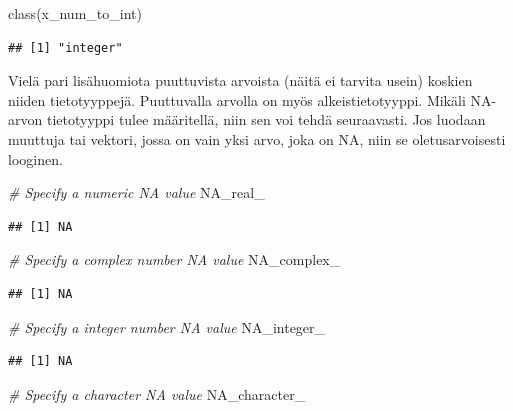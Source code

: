 \documentclass[
]{book}
\newenvironment{Shaded}{\begin{snugshade}}{\end{snugshade}}
\newcommand{\CommentTok}[1]{\textcolor[rgb]{0.56,0.35,0.01}{\textit{#1}}}
\newcommand{\ConstantTok}[1]{\textcolor[rgb]{0.00,0.00,0.00}{#1}}
\newcommand{\FunctionTok}[1]{\textcolor[rgb]{0.00,0.00,0.00}{#1}}
\newcommand{\NormalTok}[1]{#1}
\begin{document}
\begin{Shaded}
\begin{Highlighting}[]
\FunctionTok{class}\NormalTok{(x\_num\_to\_int)}
\end{Highlighting}
\end{Shaded}

\begin{verbatim}
## [1] "integer"
\end{verbatim}

Vielä pari lisähuomiota puuttuvista arvoista (näitä ei tarvita usein) koskien niiden tietotyyppejä. Puuttuvalla arvolla on myös alkeistietotyyppi. Mikäli NA-arvon tietotyyppi tulee määritellä, niin sen voi tehdä seuraavasti. Jos luodaan muuttuja tai vektori, jossa on vain yksi arvo, joka on NA, niin se oletusarvoisesti looginen.

\begin{Shaded}
\begin{Highlighting}[]
\CommentTok{\# Specify a numeric NA value}
\ConstantTok{NA\_real\_}
\end{Highlighting}
\end{Shaded}

\begin{verbatim}
## [1] NA
\end{verbatim}

\begin{Shaded}
\begin{Highlighting}[]
\CommentTok{\# Specify a complex number NA value}
\ConstantTok{NA\_complex\_}
\end{Highlighting}
\end{Shaded}

\begin{verbatim}
## [1] NA
\end{verbatim}

\begin{Shaded}
\begin{Highlighting}[]
\CommentTok{\# Specify a integer number NA value}
\ConstantTok{NA\_integer\_}
\end{Highlighting}
\end{Shaded}

\begin{verbatim}
## [1] NA
\end{verbatim}

\begin{Shaded}
\begin{Highlighting}[]
\CommentTok{\# Specify a character NA value}
\ConstantTok{NA\_character\_}
\end{Highlighting}
\end{Shaded}
\end{document}
